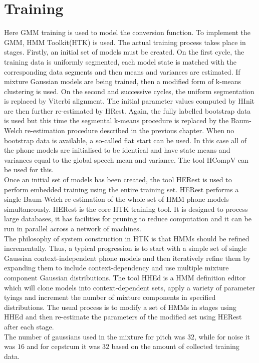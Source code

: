 \documentclass[BTech]{nitkdiss}
\begin{document}
\section{Training}
Here GMM training is used to model the conversion function. To implement the GMM, HMM Toolkit(HTK) is used. The actual training process takes place in stages. Firstly, an initial set of models must be created. On the first cycle, the training data is uniformly segmented, each model state is matched with the corresponding data segments and then means and variances are estimated. If mixture Gaussian models are being trained, then a modified form of k-means clustering is used. On the second and successive cycles, the uniform segmentation is replaced by Viterbi alignment. The initial parameter values computed by HInit are then further re-estimated by HRest. Again, the fully labelled bootstrap data is used but this time the segmental k-means procedure is replaced by the Baum-Welch re-estimation procedure described in the previous chapter. When no bootstrap data is available, a so-called flat start can be used. In this case all of the phone models are initialised to be identical and have state means and variances equal to the global speech mean and variance. The tool HCompV can be used for this.\bigskip\\
Once an initial set of models has been created, the tool HERest is used to perform embedded training using the entire training set. HERest performs a single Baum-Welch re-estimation of the whole set of HMM phone models simultaneously. HERest is the core HTK training tool. It is designed to process large databases, it has facilities for pruning to reduce computation and it can be run in parallel across a network of machines.\bigskip\\
The philosophy of system construction in HTK is that HMMs should be refined incrementally. Thus, a typical progression is to start with a simple set of single Gaussian context-independent phone models and then iteratively refine them by expanding them to include context-dependency and use multiple mixture component Gaussian distributions. The tool HHEd is a HMM definition editor which will clone models into context-dependent sets, apply a variety of parameter tyings and increment the number of mixture components in specified distributions. The usual process is to modify a set of HMMs in stages using HHEd and then re-estimate the parameters of the modified set using HERest after each stage.\bigskip\\
The number of gaussians used in the mixture for pitch was $32$, while for noise it was $16$ and for cepstrum it was $32$ based on the amount of collected training data.
\end{document}
